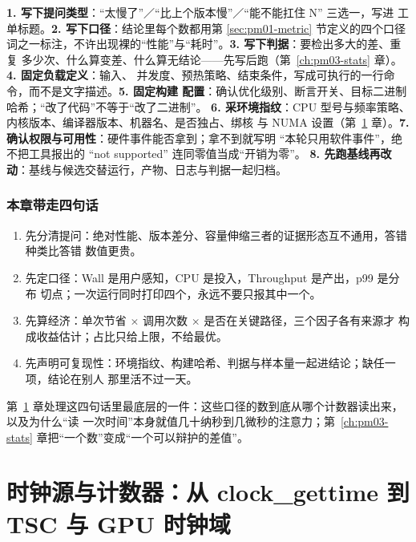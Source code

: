 \documentclass[12pt,a4paper,fontset=fandol]{ctexbook}
\newcommand{\Lang}[1]{\textsf{#1}}
\newcommand{\MWall}{\Lang{Wall}}
\newcommand{\MCpu}{\Lang{CPU}}
\newcommand{\MThr}{\Lang{Throughput}}
\newcommand{\Mx}[1]{\textsf{#1}}
\begin{document}
\begin{bestpractice}[title={开工前的八步起手式（每次性能任务重跑一遍）}]
\small
\textbf{1. 写下提问类型}：``太慢了''／``比上个版本慢''／``能不能扛住 N'' 三选一，写进
工单标题。\textbf{2. 写下口径}：结论里每个数都用第 \ref{sec:pm01-metric} 节定义的四个口径
词之一标注，不许出现裸的``性能''与``耗时''。\textbf{3. 写下判据}：要检出多大的差、重复
多少次、什么算变差、什么算无结论——先写后跑（第~\ref{ch:pm03-stats} 章）。\textbf{4. 固定负载定义}：输入、
并发度、预热策略、结束条件，写成可执行的一行命令，而不是文字描述。\textbf{5. 固定构建
配置}：确认优化级别、断言开关、目标二进制哈希；``改了代码''不等于``改了二进制''。
\textbf{6. 采环境指纹}：CPU 型号与频率策略、内核版本、编译器版本、机器名、是否独占、绑核
与 NUMA 设置（第~\ref{ch:pm02-clock} 章）。\textbf{7. 确认权限与可用性}：硬件事件能否拿到；拿不到就写明
``本轮只用软件事件''，绝不把工具报出的 ``not supported'' 连同零值当成``开销为零''。
\textbf{8. 先跑基线再改动}：基线与候选交替运行，产物、日志与判据一起归档。
\end{bestpractice}

\subsection{本章带走四句话}
\label{sub:pm01-takeaway}

\begin{enumerate}
  \item 先分清提问：绝对性能、版本差分、容量伸缩三者的证据形态互不通用，答错种类比答错
    数值更贵。
  \item 先定口径：\MWall{} 是用户感知，\MCpu{} 是投入，\MThr{} 是产出，\Mx{p99} 是分布
    切点；一次运行同时打印四个，永远不要只报其中一个。
  \item 先算经济：单次节省 $\times$ 调用次数 $\times$ 是否在关键路径，三个因子各有来源才
    构成收益估计；占比只给上限，不给最优。
  \item 先声明可复现性：环境指纹、构建哈希、判据与样本量一起进结论；缺任一项，结论在别人
    那里活不过一天。
\end{enumerate}

第~\ref{ch:pm02-clock} 章处理这四句话里最底层的一件：这些口径的数到底从哪个计数器读出来，以及为什么``读
一次时间''本身就值几十纳秒到几微秒的注意力；第~\ref{ch:pm03-stats} 章把``一个数''变成``一个可以辩护的差值''。


\chapter{时钟源与计数器：从 clock\_gettime 到 TSC 与 GPU 时钟域}
\label{ch:pm02-clock}
\end{document}
